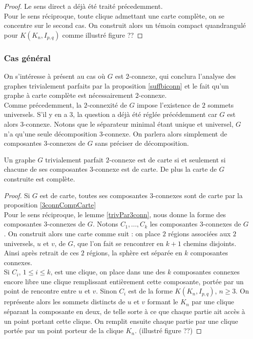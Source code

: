 \documentclass{scrartcl}
\begin{document}
\begin{flushleft}
\begin{proof}
    Le sens direct a déjà été traité précedemment.\\
    Pour le sens réciproque, toute clique admettant une carte complète, on se concentre sur le second cas. On construit
    alors un témoin compact quandrangulé pour $K(K_n, I_{p,q})$ comme illustré figure ??
\end{proof}

\subsubsection{Cas général}

On s'intéresse à présent au cas où $G$ est $2$-connexe, qui conclura l'analyse des graphes trivialement parfaits par la proposition
\ref{suffbiconn} et le fait qu'un graphe à carte complète est nécessairement $2$-connexe.\\
Comme précedemment, la $2$-connexité de $G$ impose l'existence de $2$ sommets universels. S'il y en a $3$, la question
a déjà été réglée précédemment car $G$ est alors $3$-connexe. Notons que le séparateur minimal étant unique et universel,
$G$ n'a qu'une seule décomposition $3$-connexe. On parlera alors simplement de composantes $3$-connexes de $G$ sans préciser
de décomposition.

\begin{theorem}
    Un graphe $G$ trivialement parfait $2$-connexe est de carte si et seulement si chacune de ses composantes $3$-connexe est de carte.
    De plus la carte de $G$ construite est complète.
\end{theorem}

\begin{proof}
    Si $G$ est de carte, toutes ses composantes $3$-connexes sont de carte par la proposition \ref{3connCompCarte}\\
    Pour le sens réciproque, le lemme \ref{trivPar3conn}, nous donne la forme des composantes $3$-connexes de $G$.
    Notons $C_1, ..., C_k$ les composantes $3$-connexes de $G$. On construit alors une carte comme suit :
    on place $2$ régions associées aux $2$ universels, $u$ et $v$, de $G$, que l'on fait se rencontrer en $k+1$ chemins disjoints.
    Ainsi après retrait de ces $2$ régions, la sphère est séparée en $k$ composantes connexes.\\
    Si $C_i$, $1 \leq i \leq k$, est une clique, on place dans une des $k$ composantes connexes encore libre une clique
    remplissant entièrement cette composante, portée par un point de rencontre entre $u$ et $v$. Sinon $C_i$ est
    de la forme $K(K_n, I_{p,q})$, $n \geq 3$. On représente alors les sommets distincts de $u$ et $v$ formant le $K_n$
    par une clique séparant la composante en deux, de telle sorte à ce que chaque partie ait accès à un point portant
    cette clique. On remplit ensuite chaque partie par une clique portée par un point porteur de la clique $K_n$.
    (illustré figure ??)
\end{proof}


\end{flushleft}
\end{document}
